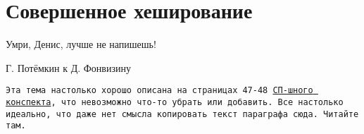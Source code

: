 \section{Совершенное хеширование}

\epigraph{Умри, Денис, лучше не напишешь!}{Г. Потёмкин к Д. Фонвизину}

\texttt{Эта тема настолько хорошо описана на страницах 47-48 \href{https://bsse.compscicenter.ru/wiki/images/b/b6/Algorithms_I.pdf}{СП-шного конспекта}, что невозможно что-то убрать или добавить. Все настолько идеально, что даже нет смысла копировать текст параграфа сюда. Читайте там.}